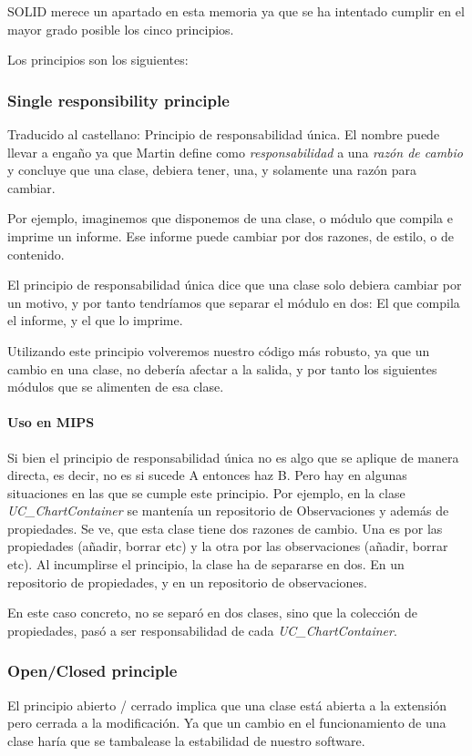 SOLID merece un apartado en esta memoria ya que se ha intentado cumplir en el mayor grado posible los cinco principios.

Los principios son los siguientes:
\subsubsection{Single responsibility principle}
Traducido al castellano: Principio de responsabilidad \'{u}nica. El nombre puede llevar a enga\~{n}o ya que Martin define como 
\emph{responsabilidad}
a una \emph{raz\'{o}n de cambio} \cite{SOLID:SRP} y concluye que una clase, debiera tener, una, y solamente una raz\'{o}n 
para cambiar.

Por ejemplo, imaginemos que disponemos de una clase, o m\'{o}dulo que compila e imprime un informe. 
Ese informe puede cambiar por dos razones, de estilo, o de contenido. 

El principio de responsabilidad \'{u}nica dice que una clase solo debiera cambiar por un motivo, y por 
tanto tendr\'{i}amos que separar el m\'{o}dulo en dos: El que compila el informe, y el que lo imprime.

Utilizando este principio volveremos nuestro c\'{o}digo m\'as robusto, ya que un cambio en una clase, no 
deber\'{i}a afectar a la salida, y por tanto los siguientes m\'{o}dulos que se alimenten de esa clase.

\paragraph{Uso en MIPS}
Si bien el principio de responsabilidad \'unica no es algo que se aplique de manera directa, es decir,
no es si sucede A entonces haz B. Pero hay en algunas situaciones en las que se cumple este principio.
Por ejemplo, en la clase \emph{UC\_ChartContainer} se manten\'ia un repositorio de Observaciones
y adem\'as de propiedades. Se ve, que esta clase tiene dos razones de cambio. Una es por las propiedades
(a\~nadir, borrar etc) y la otra por las observaciones (a\~nadir, borrar etc). Al incumplirse el principio,
la clase ha de separarse en dos. En un repositorio de propiedades, y en un repositorio de observaciones.

En este caso concreto, no se separ\'o en dos clases, sino que la colecci\'on de propiedades, pas\'o a ser
responsabilidad de cada \emph{UC\_ChartContainer}.

\subsubsection{Open/Closed principle}
El principio abierto / cerrado \cite{SOLID:OCP} implica que una clase est\'{a} abierta a la extensi\'{o}n pero cerrada a la 
modificaci\'{o}n. Ya que un cambio en el
funcionamiento de una clase har\'{i}a que se tambalease la estabilidad de nuestro software.

